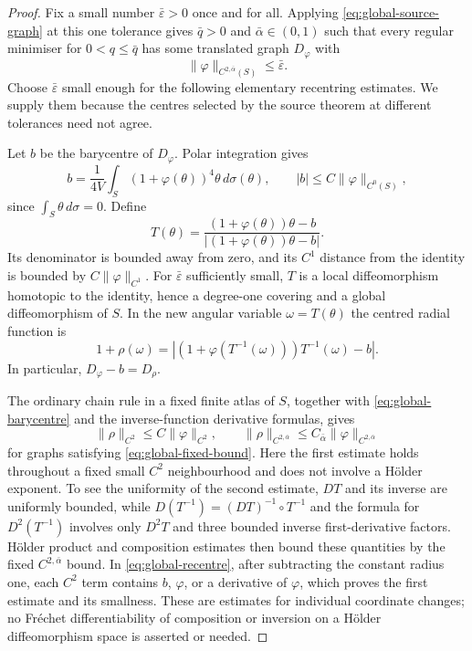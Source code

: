 \documentclass[11pt,a4paper]{article}
\theoremstyle{definition}
\theoremstyle{remark}
\begin{document}
\begin{proof}
Fix a small number $\bar\varepsilon>0$ once and for all.
Applying \eqref{eq:global-source-graph} at this one tolerance gives
$\bar q>0$ and $\bar\alpha\in(0,1)$ such that every regular minimiser
for $0<q\leq\bar q$ has some translated graph $D_\varphi$ with
\begin{equation}
 \|\varphi\|_{C^{2,\bar\alpha}(S)}\leq\bar\varepsilon.
 \label{eq:global-fixed-bound}
\end{equation}
Choose $\bar\varepsilon$ small enough for the following elementary
recentring estimates.  We supply them because the centres selected
by the source theorem at different tolerances need not agree.

Let $b$ be the barycentre of $D_\varphi$.  Polar integration gives
\begin{equation}
 b=\frac1{4V}\int_S(1+\varphi(\theta))^4\theta\,d\sigma(\theta),
 \qquad |b|\leq C\|\varphi\|_{C^0(S)},
 \label{eq:global-barycentre}
\end{equation}
since $\int_S\theta\,d\sigma=0$.
Define
\[
 T(\theta)=\frac{(1+\varphi(\theta))\theta-b}
                 {|(1+\varphi(\theta))\theta-b|}.
\]
Its denominator is bounded away from zero, and its $C^1$ distance
from the identity is bounded by $C\|\varphi\|_{C^1}$.
For $\bar\varepsilon$ sufficiently small, $T$ is a local
diffeomorphism homotopic to the identity, hence a degree-one covering
and a global diffeomorphism of $S$.  In the new angular variable
$\omega=T(\theta)$ the centred radial function is
\begin{equation}
 1+\rho(\omega)=
 \left|(1+\varphi(T^{-1}(\omega)))T^{-1}(\omega)-b\right|.
 \label{eq:global-recentre}
\end{equation}
In particular, $D_\varphi-b=D_\rho$.

The ordinary chain rule in a fixed finite atlas of $S$, together with
\eqref{eq:global-barycentre} and the inverse-function derivative
formulas, gives
\begin{equation}
 \|\rho\|_{C^2}\leq C\|\varphi\|_{C^2},
 \qquad
 \|\rho\|_{C^{2,\bar\alpha}}\leq
                  C_{\bar\alpha}\|\varphi\|_{C^{2,\bar\alpha}}
 \label{eq:global-recentre-estimates}
\end{equation}
for graphs satisfying \eqref{eq:global-fixed-bound}.
Here the first estimate holds throughout a fixed small $C^2$
neighbourhood and does not involve a H\"older exponent.
To see the uniformity of the second estimate, $DT$ and its inverse
are uniformly bounded, while
$D(T^{-1})=(DT)^{-1}\circ T^{-1}$ and the formula for
$D^2(T^{-1})$ involves only $D^2T$ and three bounded inverse
first-derivative factors.  H\"older product and composition estimates
then bound these quantities by the fixed $C^{2,\bar\alpha}$ bound.
In \eqref{eq:global-recentre}, after subtracting the constant radius
one, each $C^2$ term contains $b$, $\varphi$, or a derivative of
$\varphi$, which proves the first estimate and its smallness.
These are estimates for individual coordinate changes; no
Fr\'echet differentiability of composition or inversion on a H\"older
diffeomorphism space is asserted or needed.


\end{proof}
\end{document}
